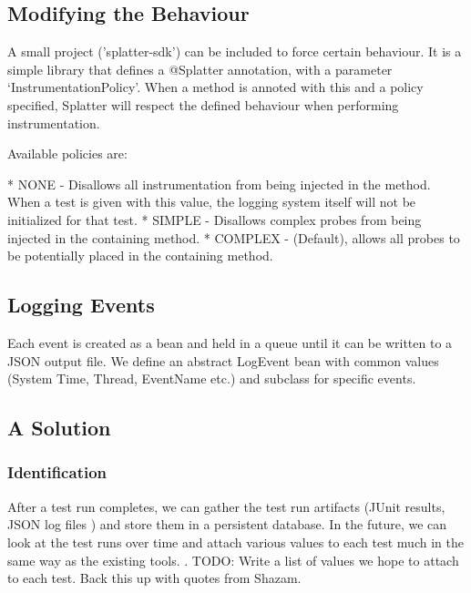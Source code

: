 \subsection{Modifying the Behaviour}

A small project ('splatter-sdk') can be included to force certain behaviour. It is a simple library that defines a @Splatter annotation, with a parameter {\lq}InstrumentationPolicy{\rq}. When a method is annoted with this and a policy specified, Splatter will respect the defined behaviour when performing instrumentation.

Available policies are:

* NONE - Disallows all instrumentation from being injected in the method. When a test is given with this value, the logging system itself will not be initialized for that test.
* SIMPLE - Disallows complex probes from being injected in the containing method.
* COMPLEX - (Default), allows all probes to be potentially placed in the containing method.

\subsection{Logging Events}

Each event is created as a bean and held in a queue until it can be written to a JSON output file. We define an abstract LogEvent bean with common values (System Time, Thread, EventName etc.) and subclass for specific events.



\subsection{A Solution}

\subsubsection{Identification}

After a test run completes, we can gather the test run artifacts (JUnit results, \heisentest{} JSON log files \etc) and store them in a persistent database. In the future, we can look at the test runs over time and attach various values to each test much in the same way as the existing tools. .
TODO: Write a list of values we hope to attach to each test. Back this up with quotes from Shazam.


